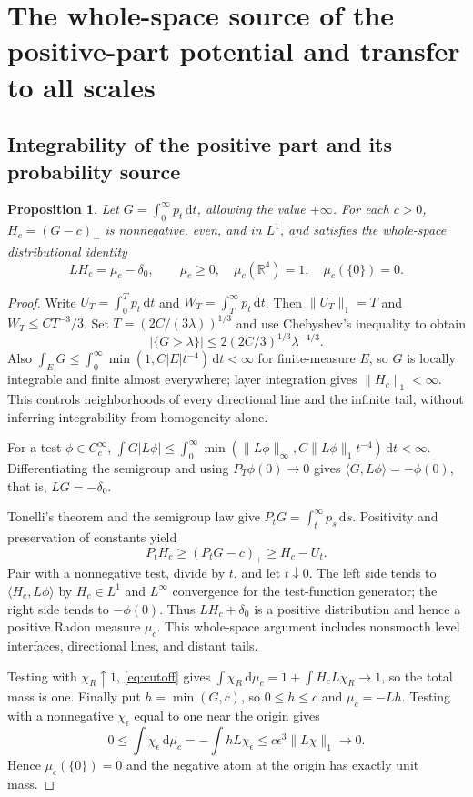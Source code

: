 \documentclass[11pt,a4paper]{article}
\newtheorem{proposition}[theorem]{Proposition}
\theoremstyle{remark}\newtheorem{remark}[theorem]{Remark}
\newcommand{\R}{\mathbb R}\newcommand{\dd}{\,\mathrm d}
\newcommand{\1}{\mathbf1}\newcommand{\pos}[1]{(#1)_+}
\begin{document}
\section{The whole-space source of the positive-part potential and transfer to all scales}
\subsection{Integrability of the positive part and its probability source}
\begin{proposition}\label{prop:source}
Let $G=\int_0^\infty p_t\dd t$, allowing the value $+\infty$. For each $c>0$, $H_c=(G-c)_+$ is nonnegative, even, and in $L^1$, and satisfies the whole-space distributional identity
\begin{equation}\label{eq:source}
 LH_c=\mu_c-\delta_0,
 \qquad \mu_c\ge0,\quad \mu_c(\R^4)=1,\quad\mu_c(\{0\})=0.
\end{equation}
\end{proposition}
\begin{proof}
Write $U_T=\int_0^Tp_t\dd t$ and $W_T=\int_T^\infty p_t\dd t$. Then $\|U_T\|_1=T$ and $W_T\le CT^{-3}/3$. Set $T=(2C/(3\lambda))^{1/3}$ and use Chebyshev's inequality to obtain
\[
 |\{G>\lambda\}|\le2(2C/3)^{1/3}\lambda^{-4/3}.
\]
Also $\int_EG\le\int_0^\infty\min(1,C|E|t^{-4})\dd t<\infty$ for finite-measure $E$, so $G$ is locally integrable and finite almost everywhere; layer integration gives $\|H_c\|_1<\infty$. This controls neighborhoods of every directional line and the infinite tail, without inferring integrability from homogeneity alone.

For a test $\phi\in C_c^\infty$, $\int G|L\phi|\le\int_0^\infty\min(\|L\phi\|_\infty,C\|L\phi\|_1t^{-4})\dd t<\infty$. Differentiating the semigroup and using $P_T\phi(0)\to0$ gives $\langle G,L\phi\rangle=-\phi(0)$, that is, $LG=-\delta_0$.

Tonelli's theorem and the semigroup law give $P_tG=\int_t^\infty p_s\dd s$. Positivity and preservation of constants yield
\[
 P_tH_c\ge(P_tG-c)_+\ge H_c-U_t.
\]
Pair with a nonnegative test, divide by $t$, and let $t\downarrow0$. The left side tends to $\langle H_c,L\phi\rangle$ by $H_c\in L^1$ and $L^\infty$ convergence for the test-function generator; the right side tends to $-\phi(0)$. Thus $LH_c+\delta_0$ is a positive distribution and hence a positive Radon measure $\mu_c$. This whole-space argument includes nonsmooth level interfaces, directional lines, and distant tails.

Testing with $\chi_R\uparrow1$, \eqref{eq:cutoff} gives
$\int\chi_R\dd\mu_c=1+\int H_cL\chi_R\to1$, so the total mass is one. Finally put $h=\min(G,c)$, so $0\le h\le c$ and $\mu_c=-Lh$. Testing with a nonnegative $\chi_\epsilon$ equal to one near the origin gives
\[
 0\le\int\chi_\epsilon\dd\mu_c=-\int hL\chi_\epsilon
 \le c\epsilon^3\|L\chi\|_1\longrightarrow0.
\]
Hence $\mu_c(\{0\})=0$ and the negative atom at the origin has exactly unit mass.
\end{proof}
\end{document}
